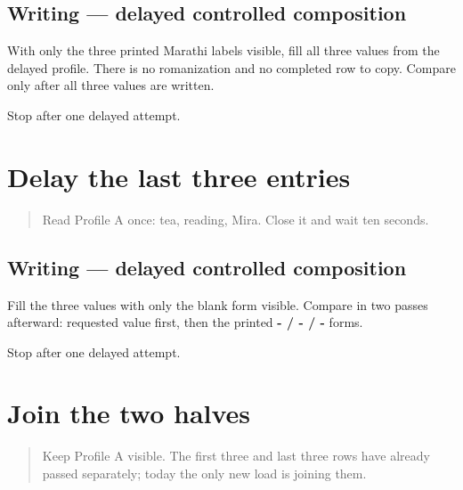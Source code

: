 \subsection*{Writing — delayed controlled composition}
With only the three printed Marathi labels visible, fill all three values from the delayed profile. There is no romanization and no completed row to copy. Compare only after all three values are written.

\begin{tcolorbox}[breakable,colback=teal!4,colframe=teal!35!black,title={Before you move on}]
Stop after one delayed attempt.
\end{tcolorbox}
\section[\mr{आवडते} \mr{पेय}: \mr{चहा} · \mr{आवडती} \mr{कृती}: \mr{वाचणे} …]{Delay the last three entries}

\label{lesson:MR-A1F11-last-three-delayed}



\begin{quote}
Read Profile A once: tea, reading, Mira. Close it and wait ten seconds.
\end{quote}

\subsection*{Writing — delayed controlled composition}
Fill the three values with only the blank form visible. Compare in two passes afterward: requested value first, then the printed \textbf{- / - / -} forms.

\begin{tcolorbox}[breakable,colback=teal!4,colframe=teal!35!black,title={Before you move on}]
Stop after one delayed attempt.
\end{tcolorbox}
\section[six-field Marathi profile]{Join the two halves}

\label{lesson:MR-A1F12-six-field-supported}



\begin{quote}
Keep Profile A visible. The first three and last three rows have already passed separately; today the only new load is joining them.
\end{quote}

